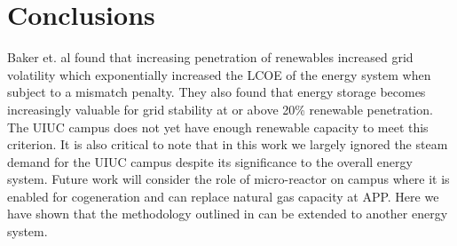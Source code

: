 \section{Conclusions}

Baker et. al found that increasing penetration of renewables increased grid volatility which exponentially increased the LCOE of the energy system when subject to a mismatch penalty. They also found that energy storage becomes increasingly valuable for grid stability at or above 20\% renewable penetration. The UIUC campus does not yet have enough renewable capacity to meet this criterion. It is also critical to note that in this work we largely ignored the steam demand for the UIUC campus despite its significance to the overall energy system. Future work will consider the role of micro-reactor on campus where it is enabled for cogeneration and can replace natural gas capacity at APP. Here we have shown that the methodology outlined in \cite{baker_optimal_2018} can be extended to another energy system. 